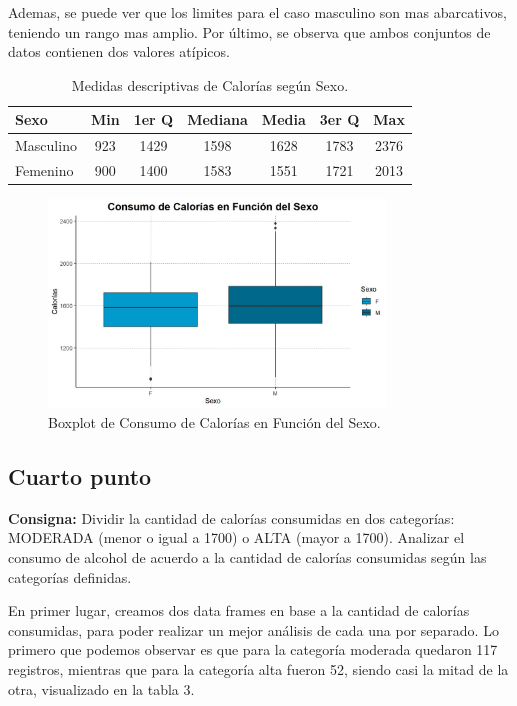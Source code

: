 \documentclass{article} %
\begin{document}
Ademas, se puede ver que los limites para el caso masculino son mas abarcativos, teniendo un rango mas amplio. Por último, se observa que ambos conjuntos de datos contienen dos valores atípicos. 

\begin{table}[H]
	\centering
		\begin{tabular}{||l || c | c | c | c | c | c ||}
			\hline
			\hline
			Sexo & Min & 1er Q & Mediana & Media & 3er Q  & Max\\
			\hline			
			\hline
			Masculino & 923 & 1429 & 1598 & 1628 & 1783 & 2376\\
			\hline
			Femenino & 900 & 1400 & 1583 & 1551 & 1721 & 2013\\
			\hline
			\hline
		\end{tabular}
		\caption{Medidas descriptivas de Calorías según Sexo.}
	\label{tab:table-punto-1-3}
\end{table}

\begin{figure}[H]
	\centering
	\includegraphics[width=0.8\textwidth]{images/1-3 Boxplot}
	\caption{Boxplot de Consumo de Calorías en Función del Sexo.}
	\label{fig:boxplot1}
\end{figure}

\subsection{Cuarto punto}

\textbf{Consigna:} Dividir la cantidad de calorías consumidas en dos categorías: MODERADA (menor o igual a 1700) o ALTA (mayor a 1700). Analizar el consumo de alcohol de acuerdo a la cantidad de calorías consumidas según las categorías definidas.

En primer lugar, creamos dos data frames en base a la cantidad de calorías consumidas, para poder realizar un mejor análisis de cada una por separado. Lo primero que podemos observar es que para la categoría moderada quedaron 117 registros, mientras que para la categoría alta fueron 52, siendo casi la mitad de la otra, visualizado en la tabla 3.
\end{document}
